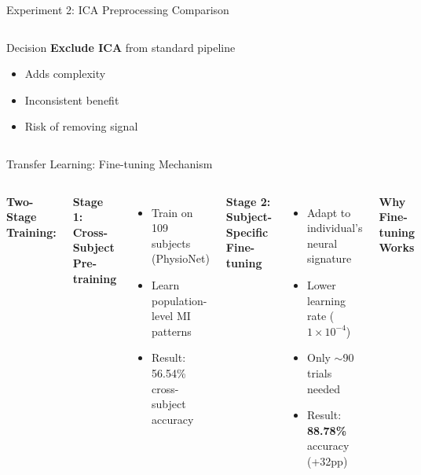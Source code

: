 \documentclass[aspectratio=169, 11pt]{beamer}
\begin{document}
\begin{frame}{Experiment 2: ICA Preprocessing Comparison}
\begin{columns}[T]
        \vspace{3mm}
        \begin{exampleblock}{Decision}
            \textbf{Exclude ICA} from standard pipeline
            \begin{itemize}
                \item Adds complexity
                \item Inconsistent benefit
                \item Risk of removing signal
            \end{itemize}
        \end{exampleblock}
    \end{columns}
\end{frame}

\begin{frame}{Transfer Learning: Fine-tuning Mechanism}
    \begin{columns}[T]
        \textbf{Two-Stage Training:}
        
        \vspace{2mm}
        \textbf{Stage 1: Cross-Subject Pre-training}
        \begin{itemize}
            \item Train on 109 subjects (PhysioNet)
            \item Learn population-level MI patterns
            \item Result: 56.54\% cross-subject accuracy
        \end{itemize}
        
        \vspace{3mm}
        \textbf{Stage 2: Subject-Specific Fine-tuning}
        \begin{itemize}
            \item Adapt to individual's neural signature
            \item Lower learning rate ($1\times10^{-4}$)
            \item Only $\sim$90 trials needed
            \item Result: \textbf{88.78\%} accuracy (+32pp)
        \end{itemize}
        
        \begin{center}
        \textbf{Why Fine-tuning Works}
        

\end{center}
\end{columns}
\end{frame}
\end{document}
